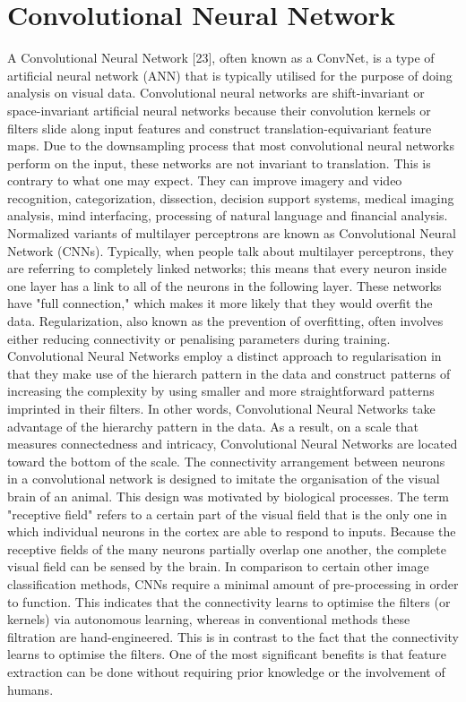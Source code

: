 \documentclass[conference]{IEEEtran}
\begin{document}
\section{Convolutional Neural Network}
A Convolutional Neural Network [23], often known as a ConvNet, is a type of artificial neural network (ANN) that is typically utilised for the purpose of doing analysis on visual data. Convolutional neural networks are shift-invariant or space-invariant artificial neural networks because their convolution kernels or filters slide along input features and construct translation-equivariant feature maps. Due to the downsampling process that most convolutional neural networks perform on the input, these networks are not invariant to translation. This is contrary to what one may expect. They can improve imagery and video recognition, categorization, dissection, decision support systems, medical imaging analysis, mind interfacing, processing of natural language and financial analysis. \\

Normalized variants of multilayer perceptrons are known as Convolutional Neural Network (CNNs). Typically, when people talk about multilayer perceptrons, they are referring to completely linked networks; this means that every neuron inside one layer has a link to all of the neurons in the following layer. These networks have "full connection," which makes it more likely that they would overfit the data. Regularization, also known as the prevention of overfitting, often involves either reducing connectivity or penalising parameters during training.  Convolutional Neural Networks employ a distinct approach to regularisation in that they make use of the hierarch pattern in the data and construct patterns of increasing the complexity by using smaller and more straightforward patterns imprinted in their filters. In other words, Convolutional Neural Networks take advantage of the hierarchy pattern in the data. As a result, on a scale that measures connectedness and intricacy, Convolutional Neural Networks are located toward the bottom of the scale. The connectivity arrangement between neurons in a convolutional network is designed to imitate the organisation of the visual brain of an animal. This design was motivated by biological processes. The term "receptive field" refers to a certain part of the visual field that is the only one in which individual neurons in the cortex are able to respond to inputs. Because the receptive fields of the many neurons partially overlap one another, the complete visual field can be sensed by the brain. In comparison to certain other image classification methods, CNNs require a minimal amount of pre-processing in order to function. This indicates that the connectivity learns to optimise the filters (or kernels) via autonomous learning, whereas in conventional methods these filtration are hand-engineered. This is in contrast to the fact that the connectivity learns to optimise the filters. One of the most significant benefits is that feature extraction can be done without requiring prior knowledge or the involvement of humans. \\
\end{document}
